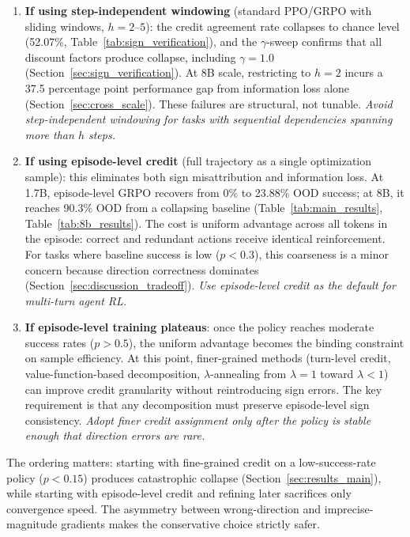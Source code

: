 \begin{enumerate}
    \item \textbf{If using step-independent windowing} (standard PPO/GRPO with sliding windows, $h = 2$--$5$): the credit agreement rate collapses to chance level (52.07\%, Table~\ref{tab:sign_verification}), and the $\gamma$-sweep confirms that all discount factors produce collapse, including $\gamma = 1.0$ (Section~\ref{sec:sign_verification}). At 8B scale, restricting to $h = 2$ incurs a 37.5 percentage point performance gap from information loss alone (Section~\ref{sec:cross_scale}). These failures are structural, not tunable. \textit{Avoid step-independent windowing for tasks with sequential dependencies spanning more than $h$ steps.}

    \item \textbf{If using episode-level credit} (full trajectory as a single optimization sample): this eliminates both sign misattribution and information loss. At 1.7B, episode-level GRPO recovers from 0\% to 23.88\% OOD success; at 8B, it reaches 90.3\% OOD from a collapsing baseline (Table~\ref{tab:main_results}, Table~\ref{tab:8b_results}). The cost is uniform advantage across all tokens in the episode: correct and redundant actions receive identical reinforcement. For tasks where baseline success is low ($p < 0.3$), this coarseness is a minor concern because direction correctness dominates (Section~\ref{sec:discussion_tradeoff}). \textit{Use episode-level credit as the default for multi-turn agent RL.}

    \item \textbf{If episode-level training plateaus}: once the policy reaches moderate success rates ($p > 0.5$), the uniform advantage becomes the binding constraint on sample efficiency. At this point, finer-grained methods (turn-level credit, value-function-based decomposition, $\lambda$-annealing from $\lambda = 1$ toward $\lambda < 1$) can improve credit granularity without reintroducing sign errors. The key requirement is that any decomposition must preserve episode-level sign consistency. \textit{Adopt finer credit assignment only after the policy is stable enough that direction errors are rare.}
\end{enumerate}

The ordering matters: starting with fine-grained credit on a low-success-rate policy ($p < 0.15$) produces catastrophic collapse (Section~\ref{sec:results_main}), while starting with episode-level credit and refining later sacrifices only convergence speed. The asymmetry between wrong-direction and imprecise-magnitude gradients makes the conservative choice strictly safer.

